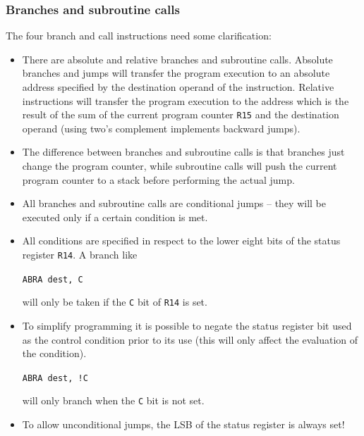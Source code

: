 \documentclass{beamer}
\begin{document}
%
   \begin{frame}
    \frametitle{Branches and subroutine calls}
    The four branch and call instructions need some clarification:
    \begin{itemize}
     \item There are absolute and relative branches and subroutine calls.
      Absolute branches and jumps will transfer the program execution to
      an absolute address specified by the destination operand of the 
      instruction.
      Relative instructions will transfer the program execution to the
      address which is the result of the sum of the current program counter
      {\tt R15} and the destination operand (using two's complement 
      implements backward jumps).
     \item The difference between branches and subroutine calls is that
      branches just change the program counter, while subroutine calls
      will push the current program counter to a stack before performing
      the actual jump. 
    \end{itemize}
   \end{frame}
%
   \begin{frame}
    \begin{itemize}
     \item All branches and subroutine calls are conditional jumps -- they 
      will be executed only if a certain condition is met. 
     \item All conditions are specified in respect to the lower eight bits
      of the status register {\tt R14}. A branch like\\
      \begin{center}
       {\tt ABRA dest, C}
      \end{center}
      will only be taken if the {\tt C} bit of {\tt R14} is set.
     \item To simplify programming it is possible to negate the status
      register bit used as the control condition prior to its use (this 
      will only affect the evaluation of the condition).
      \begin{center}
       {\tt ABRA dest, !C}
      \end{center}
      will only branch when the {\tt C} bit is not set.
     \item To allow unconditional jumps, the LSB of the status register
      is always set!
    \end{itemize}
   \end{frame}
\end{document}
